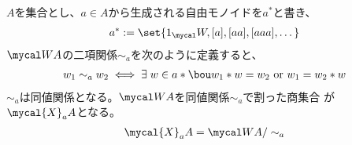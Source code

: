 	$A$を集合とし、$a\in A$から生成される自由モノイドを$a^*$と書き、
	\begin{equation*}\begin{split}
		a^* := \set{1_\Word,[a],[aa],[aaa],\dots}
	\end{split}\end{equation*}
	$\Word A$の二項関係$\sim_a$を次のように定義すると、
	\begin{equation*}\begin{split}
		w_1\sim_a w_2 \iff \exists\;w\in a*\bou w_1*w = w_2 \text{ or }
		w_1 = w_2*w
	\end{split}\end{equation*}
	$\sim_a$は同値関係となる。$\Word A$を同値関係$\sim_a$で割った商集合
	が$\mycal{X}_aA$となる。
	\begin{equation*}\begin{split}
		\mycal{X}_aA = \Word A/\sim_a
	\end{split}\end{equation*}

